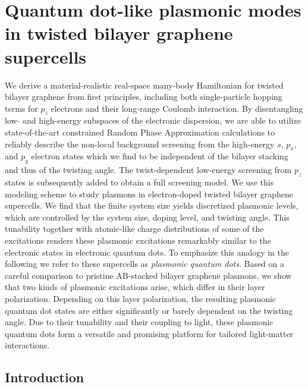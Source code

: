 \cleartoverso
\thispagestyle{empty}%
\BgThisPage
\clearpage
\chapter[Quantum dot-like plasmonic modes in twisted bilayer graphene supercells][Quantum dot-like plasmonic modes in twisted bilayer graphene supercells]{Quantum dot-like plasmonic modes in twisted bilayer graphene supercells}\label{ch:mat22}
\BgThisPage

{\small We derive a material-realistic real-space many-body Hamiltonian for twisted bilayer graphene from first principles, including both single-particle hopping terms for $p_z$ electrons and their long-range Coulomb interaction. By disentangling low- and high-energy subspaces of the electronic dispersion, we are able to utilize state-of-the-art constrained Random Phase Approximation calculations to reliably describe the non-local background screening from the high-energy $s$, $p_x$, and $p_y$ electron states which we find to be independent of the bilayer stacking and thus of the twisting angle. The twist-dependent low-energy screening from $p_z$ states is subsequently added to obtain a full screening model.  We use this modeling scheme to study plasmons in electron-doped twisted bilayer graphene supercells. We find that the finite system size yields discretized plasmonic levels, which are controlled by the system size, doping level, and twisting angle. This tunability together with atomic-like charge distributions of some of the excitations renders these plasmonic excitations remarkably similar to the electronic states in electronic quantum dots. To emphasize this analogy in the following we refer to these supercells as \emph{plasmonic quantum dots}.  Based on a careful comparison to pristine AB-stacked bilayer graphene plasmons, we show that two kinds of plasmonic excitations arise, which differ in their layer polarization. Depending on this layer polarization, the resulting plasmonic quantum dot states are either significantly or barely dependent on the twisting angle. Due to their tunability and their coupling to light, these plasmonic quantum dots form a versatile and promising platform for tailored light-matter interactions.}

\clearpage


\section{Introduction}

